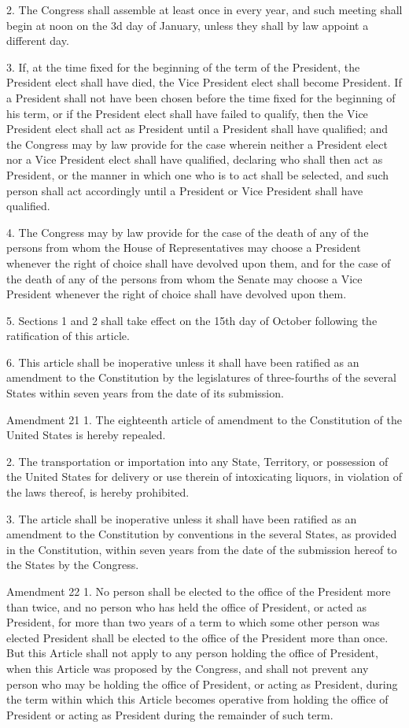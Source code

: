 \documentclass[12pt,a4paper]{article}
\begin{document}
2. The Congress shall assemble at least once in every year, and such meeting
shall begin at noon on the 3d day of January, unless they shall by law appoint
a different day.

3. If, at the time fixed for the beginning of the term of the President, the
President elect shall have died, the Vice President elect shall become
President. If a President shall not have been chosen before the time fixed for
the beginning of his term, or if the President elect shall have failed to
qualify, then the Vice President elect shall act as President until a President
shall have qualified; and the Congress may by law provide for the case wherein
neither a President elect nor a Vice President elect shall have qualified,
declaring who shall then act as President, or the manner in which one who is to
act shall be selected, and such person shall act accordingly until a President
or Vice President shall have qualified.

4. The Congress may by law provide for the case of the death of any of the
persons from whom the House of Representatives may choose a President whenever
the right of choice shall have devolved upon them, and for the case of the
death of any of the persons from whom the Senate may choose a Vice President
whenever the right of choice shall have devolved upon them.

5. Sections 1 and 2 shall take effect on the 15th day of October following the
ratification of this article.

6. This article shall be inoperative unless it shall have been ratified as an
amendment to the Constitution by the legislatures of three-fourths of the
several States within seven years from the date of its submission.

Amendment 21
1. The eighteenth article of amendment to the Constitution of the United States
is hereby repealed.

2. The transportation or importation into any State, Territory, or possession
of the United States for delivery or use therein of intoxicating liquors, in
violation of the laws thereof, is hereby prohibited.

3. The article shall be inoperative unless it shall have been ratified as an
amendment to the Constitution by conventions in the several States, as provided
in the Constitution, within seven years from the date of the submission hereof
to the States by the Congress.

Amendment 22
1. No person shall be elected to the office of the President more than twice,
and no person who has held the office of President, or acted as President, for
more than two years of a term to which some other person was elected President
shall be elected to the office of the President more than once. But this
Article shall not apply to any person holding the office of President, when this
Article was proposed by the Congress, and shall not prevent any person who may
be holding the office of President, or acting as President, during the term
within which this Article becomes operative from holding the office of
President or acting as President during the remainder of such term.
\end{document}
